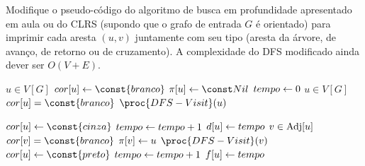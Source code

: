 Modifique o pseudo-código do algoritmo de busca em profundidade apresentado em aula ou do CLRS (supondo que o grafo de entrada $G$ é orientado) para imprimir cada aresta $(u, v)$ juntamente com seu tipo (aresta da árvore, de avanço, de retorno ou de cruzamento). A complexidade do DFS modificado ainda dever ser $O(V + E)$.

\itemdsep

\newcommand{\Branco}{\const{branco}\xspace}
\newcommand{\Cinza}{\const{cinza}\xspace}
\newcommand{\Preto}{\const{preto}\xspace}

\begin{codebox}
\li \Para \Cada $u \in V[G]$ \Faca
    \Do
\li     $cor[u] \Recebe \Branco$
\li     $\pi[u] \Recebe \Nulo$
    \End
\li $tempo \leftarrow 0$
\li \Para \Cada $u \in V[G]$ \Faca
    \Do
\li     \Se $cor[u] = \Branco$
        \Do
\li         \Entao $\proc{DFS-Visit}(u)$
        \End
    \End
\end{codebox}

\begin{codebox}
\li $cor[u] \Recebe \Cinza$
\li $tempo \leftarrow tempo + 1$
\li $d[u] \leftarrow tempo$
\li \Para \Cada $v \in \operatorname{Adj}[u]$
    \Do
\li     \Se $cor[v] = \Branco$ \Entao
        \Do
\li         \Entao
            \Do
\li             $\pi[v] \leftarrow u$
\li             $\proc{DFS-Visit}(v)$
            \End
        \End
    \End
\li $cor[u] \Recebe \Preto$
\li $tempo \leftarrow tempo + 1$
\li $f[u] \leftarrow tempo$
\end{codebox}
